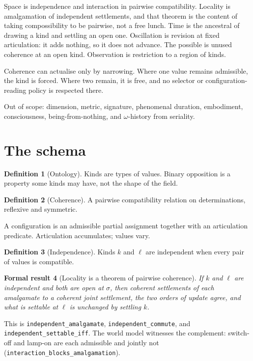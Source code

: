 \documentclass[11pt]{article}
\newtheorem{formalresult}{Formal result}[section]
\theoremstyle{definition}
\newtheorem{definition}[formalresult]{Definition}
\newcommand{\lean}[1]{\nolinkurl{#1}}
\begin{document}
Space is independence and interaction in pairwise compatibility.
Locality is amalgamation of independent settlements, and that theorem
is the content of taking compossibility to be pairwise, not a free
lunch. Time is the ancestral of drawing a kind and settling an open
one. Oscillation is revision at fixed articulation: it adds nothing,
so it does not advance. The possible is unused coherence at an open
kind. Observation is restriction to a region of kinds.

Coherence can actualise only by narrowing. Where one value remains
admissible, the kind is forced. Where two remain, it is free, and no
selector or configuration-reading policy is respected there.

Out of scope: dimension, metric, signature, phenomenal duration,
embodiment, consciousness, being-from-nothing, and $\omega$-history
from seriality.

\section{The schema}

\begin{definition}[Ontology]
Kinds are types of values. Binary opposition is a property some kinds
may have, not the shape of the field.
\end{definition}

\begin{definition}[Coherence]
A pairwise compatibility relation on determinations, reflexive and
symmetric.
\end{definition}

A configuration is an admissible partial assignment together with an
articulation predicate. Articulation accumulates; values vary.

\begin{definition}[Independence]
Kinds $k$ and $\ell$ are independent when every pair of values is
compatible.
\end{definition}

\begin{formalresult}[Locality is a theorem of pairwise coherence]
If $k$ and $\ell$ are independent and both are open at $\sigma$, then
coherent settlements of each amalgamate to a coherent joint settlement,
the two orders of update agree, and what is settable at $\ell$ is
unchanged by settling $k$.
\end{formalresult}

This is \lean{independent\_amalgamate}, \lean{independent\_commute},
and \lean{independent\_settable\_iff}. The world model witnesses the
complement: switch-off and lamp-on are each admissible and jointly not
(\lean{interaction\_blocks\_amalgamation}).
\end{document}
